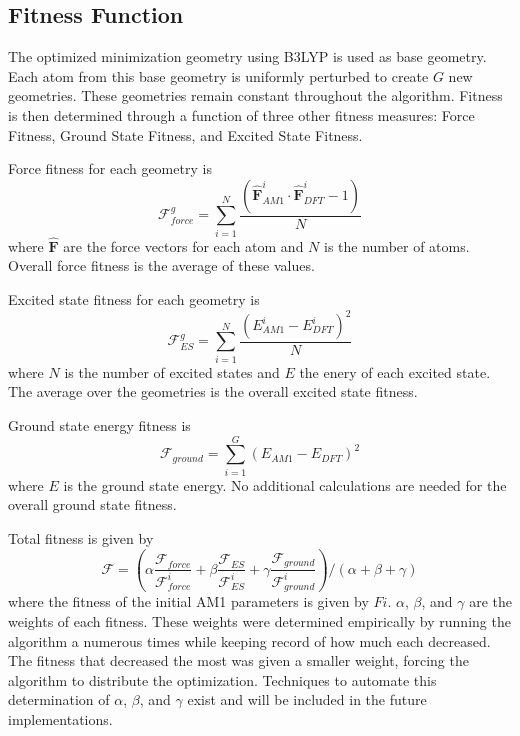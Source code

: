 \documentclass[11pt, twocolumn]{article}
\begin{document}
\subsection{Fitness Function}
The optimized minimization geometry using B3LYP is used as base geometry.
Each atom from this base geometry is uniformly perturbed to create $G$ new geometries.
These geometries remain constant throughout the algorithm.
Fitness is then determined through a function of three other fitness measures: Force Fitness, Ground State Fitness, and Excited State Fitness.

Force fitness for each geometry is
\begin{equation*}
  \mathcal{F}_{force}^{g}=\displaystyle\sum_{i=1}^{N}\frac{(\hat{\mathbf{F}}_{AM1}^{i}\cdot\hat{\mathbf{F}}_{DFT}^{i}-1)}{N}
\end{equation*}
where $\hat{\mathbf{F}}$ are the force vectors for each atom and $N$ is the number of atoms.
Overall force fitness is the average of these values.

Excited state fitness for each geometry is
\begin{equation*}
  \mathcal{F}_{ES}^{g}=\displaystyle\sum_{i=1}^{N}\frac{{\left(E_{AM1}^{i}-E_{DFT}^{i}\right)}^{2}}{N}
\end{equation*}
where $N$ is the number of excited states and $E$ the enery of each excited state.
The average over the geometries is the overall excited state fitness.

Ground state energy fitness is
\begin{equation*}
  \mathcal{F}_{ground}=\displaystyle\sum_{i=1}^{G}{\left(E_{AM1}-E_{DFT}\right)}^{2}
\end{equation*}
where $E$ is the ground state energy. No additional calculations are needed for the overall ground state fitness.

Total fitness is given by
\begin{equation*}
  \mathcal{F}={\left(\alpha\frac{\mathcal{F}_{force}}{\mathcal{F}_{force}^{i}} +
              \beta\frac{\mathcal{F}_{ES}}{\mathcal{F}_{ES}^{i}} +
              \gamma\frac{\mathcal{F}_{ground}}{\mathcal{F}_{ground}^{i}}\right)}
              /{\left(\alpha + \beta + \gamma\right)}
\end{equation*}
where the fitness of the initial AM1 parameters is given by $Fi$.
$\alpha$, $\beta$, and $\gamma$ are the weights of each fitness.
These weights were determined empirically by running the algorithm a numerous times while keeping record of how much each decreased.
The fitness that decreased the most was given a smaller weight, forcing the algorithm to distribute the optimization.
Techniques to automate this determination of $\alpha$, $\beta$, and $\gamma$ exist and will be included in the future implementations.
\end{document}
